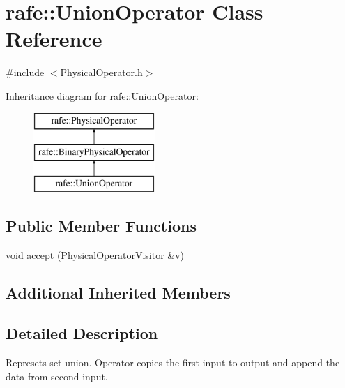 \hypertarget{classrafe_1_1_union_operator}{\section{rafe\+:\+:Union\+Operator Class Reference}
\label{classrafe_1_1_union_operator}
}


{\ttfamily \#include $<$Physical\+Operator.\+h$>$}

Inheritance diagram for rafe\+:\+:Union\+Operator\+:\begin{figure}[H]
\begin{center}
\leavevmode
\includegraphics[height=3.000000cm]{classrafe_1_1_union_operator}
\end{center}
\end{figure}
\subsection*{Public Member Functions}
\begin{DoxyCompactItemize}
\item 
void \hyperlink{classrafe_1_1_union_operator_a5ae4b5f486376c816b10a81adbe784c7}{accept} (\hyperlink{classrafe_1_1_physical_operator_visitor}{Physical\+Operator\+Visitor} \&v)
\end{DoxyCompactItemize}
\subsection*{Additional Inherited Members}


\subsection{Detailed Description}
Represets set union. Operator copies the first input to output and append the data from second input. 

